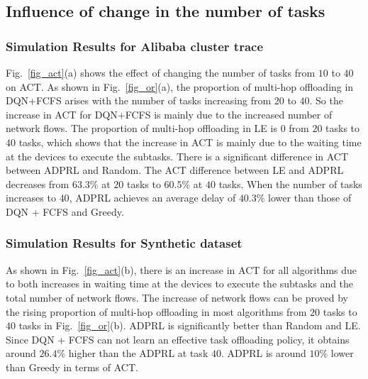 \documentclass[10pt, conference, letterpaper]{IEEEtran}
\begin{document}
\subsection{Influence of change in the number of tasks}


\subsubsection{Simulation Results for Alibaba cluster trace}

Fig.~\ref{fig_act}(a) shows the effect of changing the number of tasks from $10$ to $40$ on ACT. As shown in Fig.~\ref{fig_or}(a), the proportion of multi-hop offloading in DQN+FCFS arises with the number of tasks increasing from $20$ to $40$. So the increase in ACT for DQN+FCFS is mainly due to the increased number of network flows. The proportion of multi-hop offloading in LE is $0$ from $20$ tasks to $40$ tasks, which shows that the increase in ACT is mainly due to the waiting time at the devices to execute the subtasks. There is a significant difference in ACT between ADPRL and Random. The ACT difference between LE and ADPRL decreases from $63.3\%$ at $20$ tasks to $60.5\%$ at $40$ tasks. When the number of tasks increases to $40$, ADPRL achieves an average delay of $40.3\%$ lower than those of DQN + FCFS and Greedy.

\subsubsection{Simulation Results for Synthetic dataset}


As shown in Fig.~\ref{fig_act}(b), there is an increase in ACT for all algorithms due to both increases in waiting time at the devices to execute the subtasks and the total number of network flows. The increase of network flows can be proved by the rising proportion of multi-hop offloading in most algorithms from $20$ tasks to $40$ tasks in Fig.~\ref{fig_or}(b). ADPRL is significantly better than Random and LE. Since DQN + FCFS can not learn an effective task offloading policy, it obtains around $26.4\%$ higher than the ADPRL at task $40$. ADPRL is around $10\%$ lower than Greedy in terms of ACT.
\end{document}
